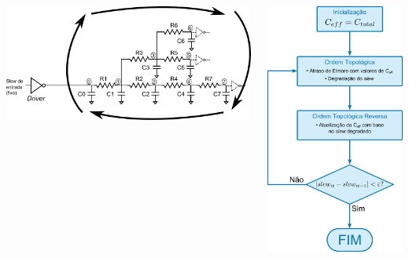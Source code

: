 \documentclass[10pt,a4paper]{beamer}
\begin{document}
		\begin{frame}[t]
			\begin{center}
				\begin{columns}
					\begin{column}{0.63\textwidth}
						\includegraphics[width=\textwidth]{img/imagem_puri2.pdf} 
					\end{column}
					\begin{column}{0.37\textwidth}
						\includegraphics[width=\textwidth]{img/fluxograma.pdf} 

\end{column}
\end{columns}
\end{center}
\end{frame}
\end{document}
